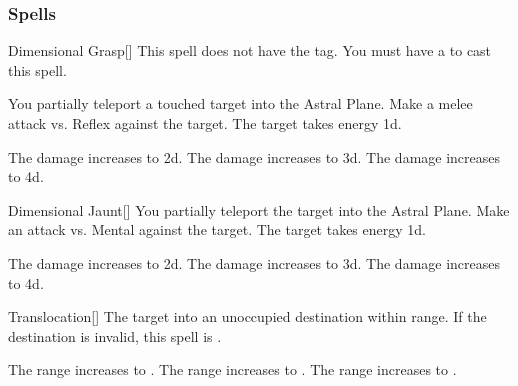\subsubsection{Spells}


\lowercase{\hypertarget{spell:Dimensional Grasp}{}}\label{spell:Dimensional Grasp}
\begin{freeability}[Rank 1]{\hypertarget{spell:Dimensional Grasp}{Dimensional Grasp}}[]
This spell does not have the  tag.
You must have a  to cast this spell.

You partially teleport a touched target into the Astral Plane.
Make a melee attack vs. Reflex against the target.
\hit The target takes energy  \plus1d.

\rankline
{} The damage increases to  \plus2d.
 The damage increases to  \plus3d.
 The damage increases to  \plus4d.

\end{freeability}
\vspace{0.25em}



\lowercase{\hypertarget{spell:Dimensional Jaunt}{}}\label{spell:Dimensional Jaunt}
\begin{freeability}[Rank 1]{\hypertarget{spell:Dimensional Jaunt}{Dimensional Jaunt}}[]
You partially teleport the target into the Astral Plane.
Make an attack vs. Mental against the target.
\hit The target takes energy  \plus1d.

\rankline
{} The damage increases to  \plus2d.
 The damage increases to  \plus3d.
 The damage increases to  \plus4d.

\end{freeability}
\vspace{0.25em}



\lowercase{\hypertarget{spell:Translocation}{}}\label{spell:Translocation}
\begin{freeability}[Rank 1]{\hypertarget{spell:Translocation}{Translocation}}[]
The target  into an unoccupied destination within range.
If the destination is invalid, this spell is .

\rankline
{} The range increases to \rngmed.
 The range increases to \rnglong.
 The range increases to \rngext.

\end{freeability}
\vspace{0.25em}



